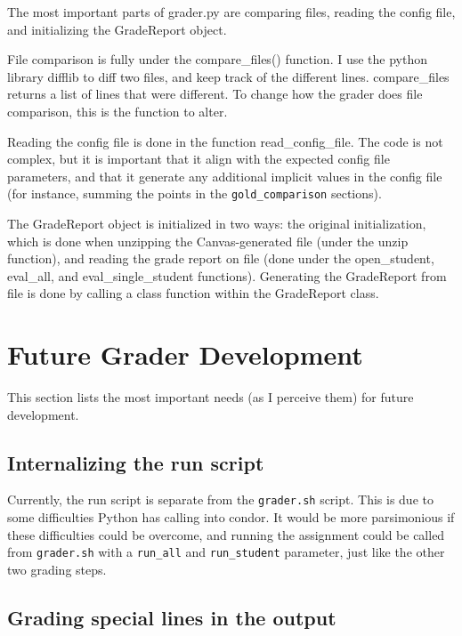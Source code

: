 \documentclass[12pt]{article}
\begin{document}
The most important parts of grader.py are comparing files, reading the config file, and initializing the GradeReport object.

File comparison is fully under the compare\_files() function. I use the python library difflib to diff two files, and keep track of the different lines. compare\_files returns a list of lines that were different. To change how the grader does file comparison, this is the function to alter.

Reading the config file is done in the function read\_config\_file. The code is not complex, but it is important that it align with the expected config file parameters, and that it generate any additional implicit values in the config file (for instance, summing the points in the \texttt{gold\_comparison} sections).

The GradeReport object is initialized in two ways: the original initialization, which is done when unzipping the Canvas-generated file (under the unzip function), and reading the grade report on file (done under the open\_student, eval\_all, and eval\_single\_student functions). Generating the GradeReport from file is done by calling a class function within the GradeReport class.

\section{Future Grader Development} \label{sec:future}

This section lists the most important needs (as I perceive them) for future development.

\subsection{Internalizing the run script} \label{sec:internalrun}

Currently, the run script is separate from the \texttt{grader.sh} script. This is due to some difficulties Python has calling into condor. It would be more parsimonious if these difficulties could be overcome, and running the assignment could be called from \texttt{grader.sh} with a \texttt{run\_all} and \texttt{run\_student} parameter, just like the other two grading steps.

\subsection{Grading special lines in the output} \label{sec:speciallines}
\end{document}
